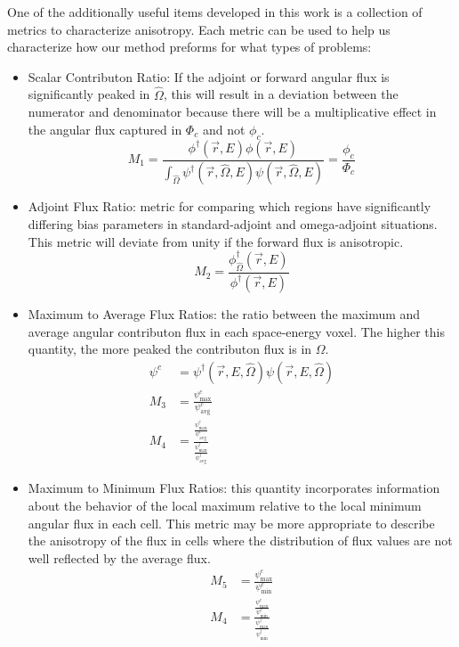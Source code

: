 \documentclass[12pt]{article}
\newcommand{\vOmega}{\ensuremath{\hat{\Omega}}}
\newcommand{\vecr}{\ensuremath{\vec{r}}}
\begin{document}
One of the additionally useful items developed in this work is a collection of metrics to characterize anisotropy. 
Each metric can be used to help us characterize how our method preforms for what types of problems:
\vspace*{-.5em}
      \begin{itemize}
      \item Scalar Contributon Ratio: If the adjoint or forward angular flux is significantly peaked in $\vOmega$, this will result in a deviation between the numerator and denominator because there will be a multiplicative effect in the angular flux captured in $\Phi_{c}$ and not $\phi_{c}$.
      \[M_{1} = \frac{\phi^{\dagger}(\vecr,E)\phi(\vecr,E)}{\int_{\vOmega}\psi^{\dagger}(\vecr,\vOmega,E)\psi(\vecr,\vOmega,E)} = \frac{\phi_{c}}{\Phi_{c}}\]
      
      \item Adjoint Flux Ratio: metric for comparing which regions have significantly differing bias parameters in standard-adjoint and omega-adjoint situations. This metric will deviate from unity if the forward flux is anisotropic.
      \[M_{2} = \frac{\phi^{\dagger}_{\vOmega}(\vecr,E)}{\phi^{\dagger}(\vecr,E)}\]
      
      \item Maximum to Average Flux Ratios: the ratio between the maximum and average angular contributon flux in each space-energy voxel. The higher this quantity, the more peaked the contributon flux is in $\Omega$. 
      \begin{align*}
      \psi^{c} &= \psi^{\dagger}(\vecr,E, \vOmega)\psi(\vecr,E, \vOmega)\\
      M_{3} &= \frac{\psi^c_{\max}}{\psi^{c}_{\text{avg}}}\\
      M_{4} &=  \frac{\frac{\psi^{c}_{\max}}{\psi^{c}_{\text{avg}}}}{\frac{\psi^{\dagger}_{\max}}{\psi^{\dagger}_{\text{avg}}}} 
      \end{align*} 
      
       \item Maximum to Minimum Flux Ratios: this quantity incorporates information about the behavior of the local maximum relative to the local minimum angular flux in each cell. This metric may be more appropriate to describe the anisotropy of the flux in cells where the distribution of flux values are not well reflected by the average flux.
       \begin{align*}
      M_{5} &= \frac{\psi^c_{\max}}{\psi^{c}_{\min}}\\
      M_{4} &=  \frac{\frac{\psi^{c}_{\max}}{\psi^{c}_{\min}}}{\frac{\psi^{\dagger}_{\max}}{\psi^{\dagger}_{\min}}}
       \end{align*}
      \end{itemize} 
 
\end{document}
